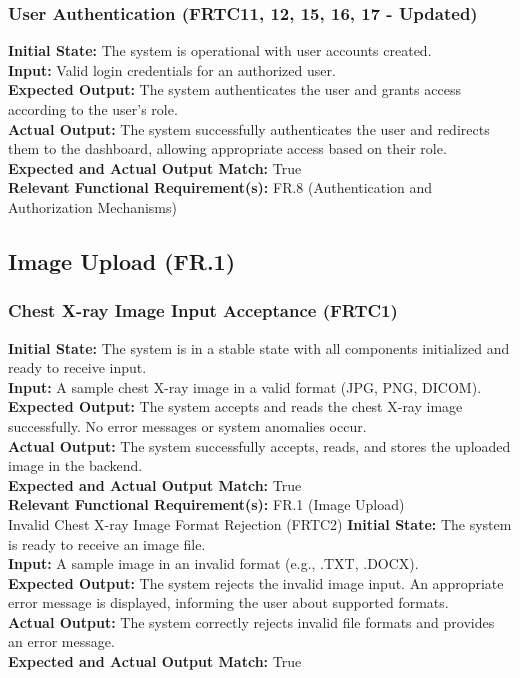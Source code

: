 \documentclass[12pt, titlepage]{article}
\begin{document}
\subsubsection{User Authentication (FRTC11, 12, 15, 16, 17 - Updated)}
\textbf{Initial State:} The system is operational with user accounts created.\\
\textbf{Input:} Valid login credentials for an authorized user.\\
\textbf{Expected Output:} The system authenticates the user and grants access according to the user's role.\\
\textbf{Actual Output:} The system successfully authenticates the user and redirects them to the dashboard, allowing appropriate access based on their role.\\
\textbf{Expected and Actual Output Match:} True\\
\textbf{Relevant Functional Requirement(s):} FR.8 (Authentication and Authorization Mechanisms)\\

\subsection{Image Upload (FR.1)}
\subsubsection{Chest X-ray Image Input Acceptance (FRTC1)}
\textbf{Initial State:} The system is in a stable state with all components initialized and ready to receive input.\\
\textbf{Input:} A sample chest X-ray image in a valid format (JPG, PNG, DICOM).\\
\textbf{Expected Output:} The system accepts and reads the chest X-ray image successfully.
No error messages or system anomalies occur.\\
\textbf{Actual Output:} The system successfully accepts, reads, and stores the uploaded image in the backend.\\
\textbf{Expected and Actual Output Match:} True\\
\textbf{Relevant Functional Requirement(s):} FR.1 (Image Upload)\\

Invalid Chest X-ray Image Format Rejection (FRTC2)
\textbf{Initial State:} The system is ready to receive an image file.\\
\textbf{Input:} A sample image in an invalid format (e.g., .TXT, .DOCX).\\
\textbf{Expected Output:} The system rejects the invalid image input.
An appropriate error message is displayed, informing the user about supported formats.\\
\textbf{Actual Output:} The system correctly rejects invalid file formats and provides an error message.\\
\textbf{Expected and Actual Output Match:} True\\
\end{document}
